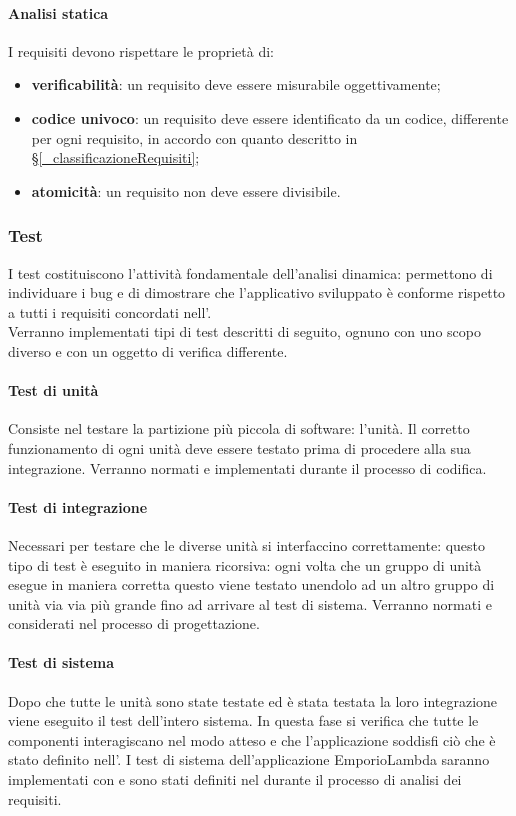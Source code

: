 \paragraph{Analisi statica}
I requisiti devono rispettare le proprietà di:
\begin{itemize}
    \item \textbf{verificabilità}: un requisito deve essere misurabile oggettivamente;
    \item \textbf{codice univoco}: un requisito deve essere identificato da un codice, differente per ogni requisito, in accordo con quanto descritto in \S\ref{_classificazioneRequisiti};
    \item \textbf{atomicità}: un requisito non deve essere divisibile.
\end{itemize}

\subsubsection{Test}
I test costituiscono l'attività fondamentale dell'analisi dinamica: permettono di individuare i bug e di dimostrare che l'applicativo sviluppato è conforme rispetto a tutti i requisiti concordati nell'.\\
Verranno implementati tipi di test descritti di seguito, ognuno con uno scopo diverso e con un oggetto di verifica differente.
\paragraph{Test di unità}
Consiste nel testare la partizione più piccola di software: l'unità. Il corretto funzionamento di ogni unità deve essere testato prima di procedere alla sua integrazione.
Verranno normati e implementati durante il processo di codifica.

\paragraph{Test di integrazione}
Necessari per testare che le diverse unità si interfaccino correttamente: questo tipo di test è eseguito in maniera ricorsiva: ogni volta che un gruppo di unità esegue in maniera corretta questo viene testato unendolo ad un altro gruppo di unità via via più grande fino ad arrivare al test di sistema.
Verranno normati e considerati nel processo di progettazione.

\paragraph{Test di sistema}
Dopo che tutte le unità sono state testate ed è stata testata la loro integrazione viene eseguito il test dell'intero sistema. In questa fase si verifica che tutte le componenti interagiscano nel modo atteso e che l'applicazione soddisfi ciò che è stato definito nell'.
I test di sistema dell'applicazione EmporioLambda saranno implementati con  e sono stati definiti nel  durante il processo di analisi dei requisiti.

